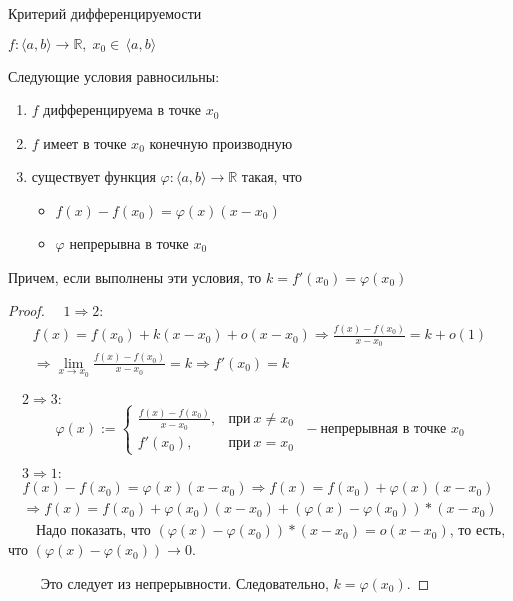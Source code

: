 \begin{theorem-non}
    Критерий дифференцируемости

    $f: \langle a, b \rangle \to \mathbb{R}, \; x_0 \in \, \langle a ,b \rangle$

    Следующие условия равносильны:
    \begin{enumerate}
        \item $f$ дифференцируема в точке $x_0$
        \item $f$ имеет в точке $x_0$ конечную производную
        \item существует функция $\varphi: \langle a, b \rangle \to \mathbb{R}$ такая, что
        \begin{itemize}
            \item $f(x) - f(x_0) = \varphi(x)(x - x_0)$
            \item $\varphi$ непрерывна в точке $x_0$
        \end{itemize}
    \end{enumerate}
    Причем, если выполнены эти условия, то $k = f'(x_0) = \varphi(x_0)$ 
\end{theorem-non}
\begin{proof} \quad 

    $\quad 1 \Rightarrow 2:$ 
    \begin{gather*}
        f(x) = f(x_0) + k(x - x_0) + o(x - x_0) \Rightarrow \frac{f(x) - f(x_0)}{x - x_0} = k + o(1) \\
        \Rightarrow \lim_{x \to x_0} \frac{f(x) - f(x_0)}{x - x_0} = k \Rightarrow f'(x_0) = k
    \end{gather*}

    $\quad 2 \Rightarrow 3:$
    \[ \varphi(x) := 
    \begin{cases}
        \frac{f(x) - f(x_0)}{x - x_0}, & \text{при}\ x \neq x_0 \\
        f'(x_0), & \text{при}\ x = x_0
    \end{cases} \; - \text{непрерывная в точке $x_0$} \]

    $\quad 3 \Rightarrow 1:$
    \begin{gather*}
        f(x) - f(x_0) = \varphi(x)(x - x_0) \Rightarrow f(x) = f(x_0) + \varphi(x)(x - x_0)\\
        \Rightarrow f(x) = f(x_0) + \varphi(x_0)(x - x_0) + (\varphi(x) - \varphi(x_0))* (x - x_0)
    \end{gather*}
    $\quad\quad$Надо показать, что $(\varphi(x) - \varphi(x_0)) * (x - x_0) = o(x - x_0)$, то есть, что $(\varphi(x) - \varphi(x_0)) \to 0$.

    $\quad\quad$ Это следует из непрерывности. Следовательно, $k = \varphi(x_0)$.
\end{proof}